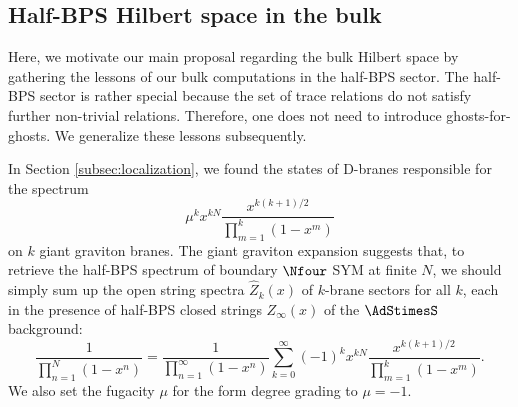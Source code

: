 \documentclass[a4paper,12pt]{article}
\begin{document}
\subsection{Half-BPS Hilbert space in the bulk} \label{subsec:halfbpsbulk}

Here, we motivate our main proposal regarding the bulk Hilbert space by gathering the lessons of our bulk computations in the half-BPS sector. The half-BPS sector is rather special because the set of trace relations do not satisfy further non-trivial relations. Therefore, one does not need to introduce ghosts-for-ghosts. We generalize these lessons subsequently.

In Section \ref{subsec:localization}, we found the states of D-branes responsible for the spectrum
\begin{equation}
\mu^k x^{k N} \frac{x^{k(k+1)/2}}{\prod_{m=1}^k (1- x^m)}
\end{equation}
on $k$ giant graviton branes. The giant graviton expansion suggests that, to retrieve the half-BPS spectrum of boundary $\Nfour$ SYM at finite $N$, we should simply sum up the open string spectra $\hat{Z}_k(x)$ of $k$-brane sectors for all $k$, each in the presence of half-BPS closed strings $Z_\infty(x)$ of the $\AdStimesS$ background:
\begin{equation} \label{eq:halfBPS gge bulk}
\frac{1}{\prod_{n=1}^N (1-x^n)} = \frac{1}{\prod_{n=1}^\infty (1-x^n)} \sum_{k=0}^\infty (-1)^k x^{k N} \frac{x^{k(k+1)/2}}{\prod_{m=1}^k (1 - x^m)}.
\end{equation}
We also set the fugacity $\mu$ for the form degree grading to $\mu = -1$.
\end{document}

